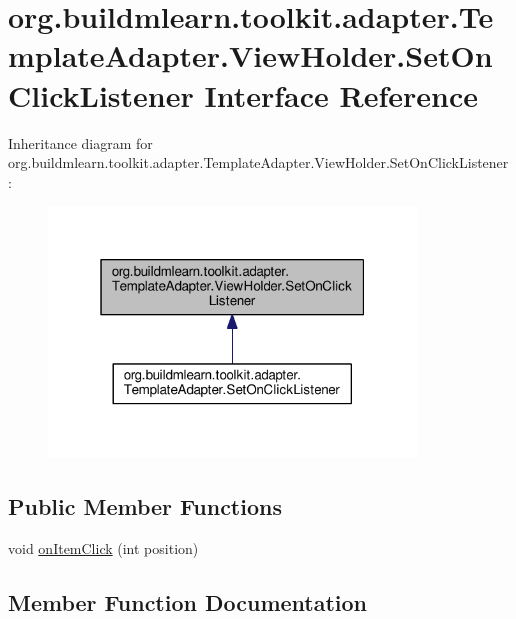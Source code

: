 \hypertarget{interfaceorg_1_1buildmlearn_1_1toolkit_1_1adapter_1_1TemplateAdapter_1_1ViewHolder_1_1SetOnClickListener}{}\section{org.\+buildmlearn.\+toolkit.\+adapter.\+Template\+Adapter.\+View\+Holder.\+Set\+On\+Click\+Listener Interface Reference}
\label{interfaceorg_1_1buildmlearn_1_1toolkit_1_1adapter_1_1TemplateAdapter_1_1ViewHolder_1_1SetOnClickListener}


Inheritance diagram for org.\+buildmlearn.\+toolkit.\+adapter.\+Template\+Adapter.\+View\+Holder.\+Set\+On\+Click\+Listener\+:
\nopagebreak
\begin{figure}[H]
\begin{center}
\leavevmode
\includegraphics[width=277pt]{interfaceorg_1_1buildmlearn_1_1toolkit_1_1adapter_1_1TemplateAdapter_1_1ViewHolder_1_1SetOnClickListener__inherit__graph}
\end{center}
\end{figure}
\subsection*{Public Member Functions}
\begin{DoxyCompactItemize}
\item 
void \hyperlink{interfaceorg_1_1buildmlearn_1_1toolkit_1_1adapter_1_1TemplateAdapter_1_1ViewHolder_1_1SetOnClickListener_a90dcde8bdc3108bd3599a8aa69309167}{on\+Item\+Click} (int position)
\end{DoxyCompactItemize}


\subsection{Member Function Documentation}
